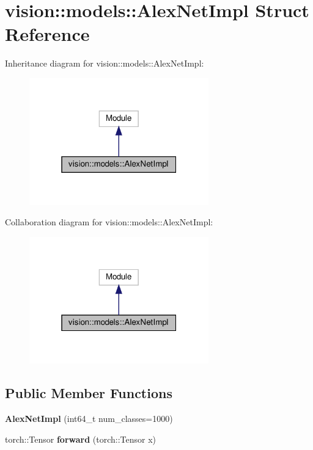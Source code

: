 \hypertarget{structvision_1_1models_1_1AlexNetImpl}{}\section{vision\+:\+:models\+:\+:Alex\+Net\+Impl Struct Reference}
\label{structvision_1_1models_1_1AlexNetImpl}


Inheritance diagram for vision\+:\+:models\+:\+:Alex\+Net\+Impl\+:
\nopagebreak
\begin{figure}[H]
\begin{center}
\leavevmode
\includegraphics[width=220pt]{structvision_1_1models_1_1AlexNetImpl__inherit__graph}
\end{center}
\end{figure}


Collaboration diagram for vision\+:\+:models\+:\+:Alex\+Net\+Impl\+:
\nopagebreak
\begin{figure}[H]
\begin{center}
\leavevmode
\includegraphics[width=220pt]{structvision_1_1models_1_1AlexNetImpl__coll__graph}
\end{center}
\end{figure}
\subsection*{Public Member Functions}
\begin{DoxyCompactItemize}
\item 
\mbox{\label{structvision_1_1models_1_1AlexNetImpl_a61551564e4299747cd7ab7ac7d86e450}} 
{\bfseries Alex\+Net\+Impl} (int64\+\_\+t num\+\_\+classes=1000)
\item 
\mbox{\label{structvision_1_1models_1_1AlexNetImpl_abcbd9a355fa73a53132ac39109aad671}} 
torch\+::\+Tensor {\bfseries forward} (torch\+::\+Tensor x)
\end{DoxyCompactItemize}
